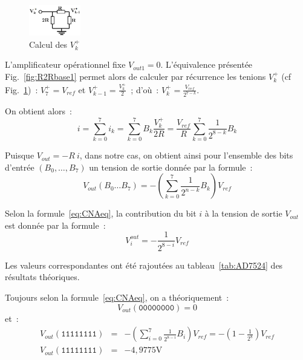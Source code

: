 \documentclass{article}
\begin{document}
\begin{figure}
  \begin{center}
    \includegraphics[width=0.2\textwidth]{AD7524eq}
  \end{center}
  \caption{Calcul des $V_k^+$}
  \label{fig:AD7524eq}
\end{figure}

L'amplificateur opérationnel fixe $V_{out1}=0$. L'équivalence présentée Fig.~\ref{fig:R2Rbase1} permet alors de calculer par récurrence les tenions $V_k^+$ (cf Fig.~\ref{fig:AD7524eq})~: $V_7^+ = V_{ref}$ et $V_{k-1}^+=\frac{V_k^+}{2}$~; d'où~: ${V_k^+=\frac{V_{ref}}{2^{7-k}}}$.

On obtient alors~:
\begin{equation*}
i = \sum_{k=0}^7 i_k = \sum_{k=0}^7 B_k \frac{V_k^+}{2R} = \frac{V_{ref}}{R} \sum_{k=0}^7 \frac{1}{2^{8-k}} B_k
\end{equation*}


Puisque $V_{out} = -R~i$, dans notre cas, on obtient ainsi pour l'ensemble des bits d'entrée $(B_0,\dots,B_7)$ un tension de sortie donnée par la formule~:
\begin{equation}
V_{out}(B_0\dots B_7) = -\left(\sum_{k=0}^{7}\frac{1}{2^{n-k}}B_k\right)V_{ref}
\label{eq:CNAeq}
\end{equation}


Selon la formule~\ref{eq:CNAeq}, la contribution du bit $i$ à la tension de sortie $V_{out}$ est donnée par la formule~:
\begin{equation*}
V_i^{out} = -\frac{1}{2^{8-i}}V_{ref}
\end{equation*}

Les valeurs correspondantes ont été rajoutées au tableau~\ref{tab:AD7524} des résultats théoriques.


Toujours selon la formule~\ref{eq:CNAeq}, on a théoriquement~:
\begin{equation*}
V_{out}(\mathtt{00000000}) = 0
\end{equation*}
et~:
\begin{eqnarray*}
V_{out}(\mathtt{11111111}) &=& -\left(\sum_{i=0}^{7}\frac{1}{2^{8-i}}B_i\right)V_{ref} = -(1-\frac{1}{2^8})V_{ref}\\
V_{out}(\mathtt{11111111}) &=& -4,9775\mathrm{V}
\end{eqnarray*}
\end{document}
